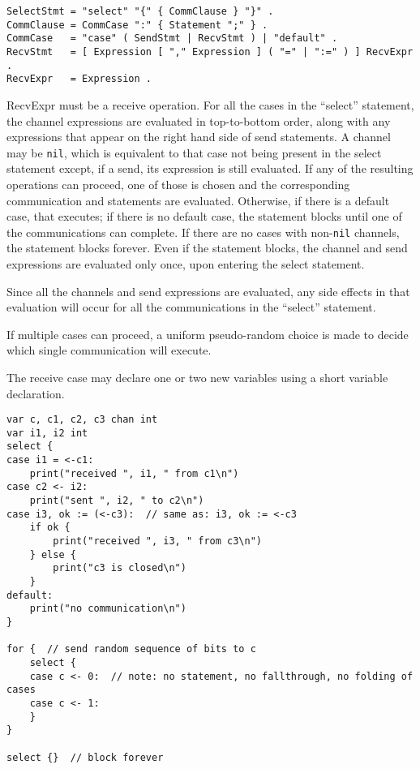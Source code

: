 \begin{Verbatim}[frame=single]
SelectStmt = "select" "{" { CommClause } "}" .
CommClause = CommCase ":" { Statement ";" } .
CommCase   = "case" ( SendStmt | RecvStmt ) | "default" .
RecvStmt   = [ Expression [ "," Expression ] ( "=" | ":=" ) ] RecvExpr .
RecvExpr   = Expression .
\end{Verbatim}

RecvExpr must be a receive operation. For
all the cases in the ``select'' statement, the channel expressions are
evaluated in top-to-bottom order, along with any expressions that appear
on the right hand side of send statements. A channel may be
\texttt{nil}, which is equivalent to that case not being present in the
select statement except, if a send, its expression is still evaluated.
If any of the resulting operations can proceed, one of those is chosen
and the corresponding communication and statements are evaluated.
Otherwise, if there is a default case, that executes; if there is no
default case, the statement blocks until one of the communications can
complete. If there are no cases with non-\texttt{nil} channels, the
statement blocks forever. Even if the statement blocks, the channel and
send expressions are evaluated only once, upon entering the select
statement.

Since all the channels and send expressions are evaluated, any side
effects in that evaluation will occur for all the communications in the
``select'' statement.

If multiple cases can proceed, a uniform pseudo-random choice is made to
decide which single communication will execute.

The receive case may declare one or two new variables using a
short variable declaration.

\begin{Verbatim}[frame=single]
var c, c1, c2, c3 chan int
var i1, i2 int
select {
case i1 = <-c1:
    print("received ", i1, " from c1\n")
case c2 <- i2:
    print("sent ", i2, " to c2\n")
case i3, ok := (<-c3):  // same as: i3, ok := <-c3
    if ok {
        print("received ", i3, " from c3\n")
    } else {
        print("c3 is closed\n")
    }
default:
    print("no communication\n")
}

for {  // send random sequence of bits to c
    select {
    case c <- 0:  // note: no statement, no fallthrough, no folding of cases
    case c <- 1:
    }
}

select {}  // block forever
\end{Verbatim}


